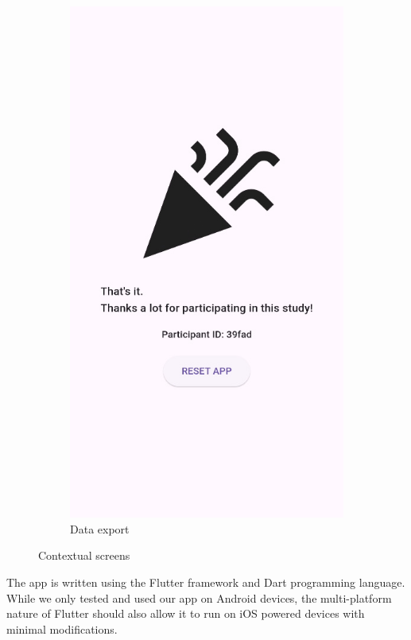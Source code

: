 \begin{figure}[!htb]
\begin{subfigure}{.25\textwidth}
        \includegraphics[width=.8666\linewidth]{images/app_reset_screen.jpg}
        \caption{Data export}
        \label{subfig:app_data_export}
    \end{subfigure}
    \caption{Contextual screens}
\end{figure}

\noindent
The app is written using the Flutter framework and Dart programming language.
While we only tested and used our app on Android devices, the multi-platform nature of Flutter should also allow it to run on iOS powered devices with minimal modifications.
